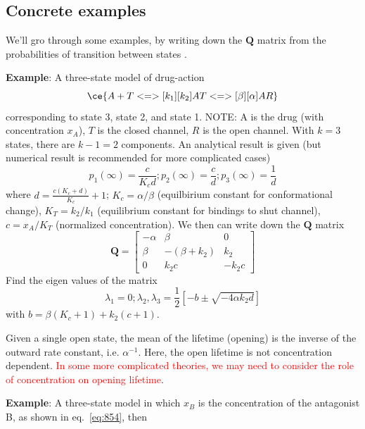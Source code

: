 \subsection{Concrete examples}

We'll gro through some examples, by writing down the $\mathbf{Q}$ matrix from
the probabilities of transition between states \citep{colquhoun1977rfm}.

{\bf Example}: A three-state model of drug-action
\begin{equation}
\label{eq:4452}
\ce{ A + T <=>[k_1][k_2] AT <=>[\beta][\alpha] AR}
\end{equation}
corresponding to state 3, state 2, and state 1. NOTE: A is the drug (with
concentration $x_A$), $T$ is the closed channel, $R$ is the open channel. With
$k=3$ states, there are $k-1=2$ components. An analytical result is given (but
numerical result is recommended for more complicated cases)
\begin{equation}
p_1(\infty) = \frac{c}{K_cd}; p_2(\infty)=\frac{c}{d}; p_3(\infty)=\frac{1}{d}
\end{equation}
where $d=\frac{c(K_c+d)}{K_c}+1$; $K_c=\alpha/\beta$ (equilbirium constant for
conformational change), $K_T=k_2/k_1$ (equilibrium constant for
bindings to shut channel), $c=x_A/K_T$ (normalized concentration). We then can
write down the $\mathbf{Q}$ matrix
\begin{equation}
\mathbf{Q} =\left[ \begin{array}{ccc}
-\alpha & \beta	 & 0 \\
\beta & -(\beta+k_2) & k_2	\\
0 & k_2c & -k_2c
\end{array} \right]
\end{equation}
Find the eigen values of the matrix
\begin{equation}
\lambda_1 = 0; \lambda_2,\lambda_3 = \frac{1}{2}\left[ -b \pm \sqrt{-4\alpha k_2
d} \right]
\end{equation}
with $b=\beta(K_c+1)+k_2(c+1)$.

Given a single open state, the mean of the lifetime (opening) is the inverse of
the outward rate constant, i.e. $\alpha^{-1}$. Here, the open lifetime is not
concentration dependent. \textcolor{red}{In some more complicated theories, we
may need to consider the role of concentration on opening lifetime}.




{\bf Example}: A three-state model in which $x_B$ is the concentration of the
antagonist B, as shown in eq.~\eqref{eq:854}, then

